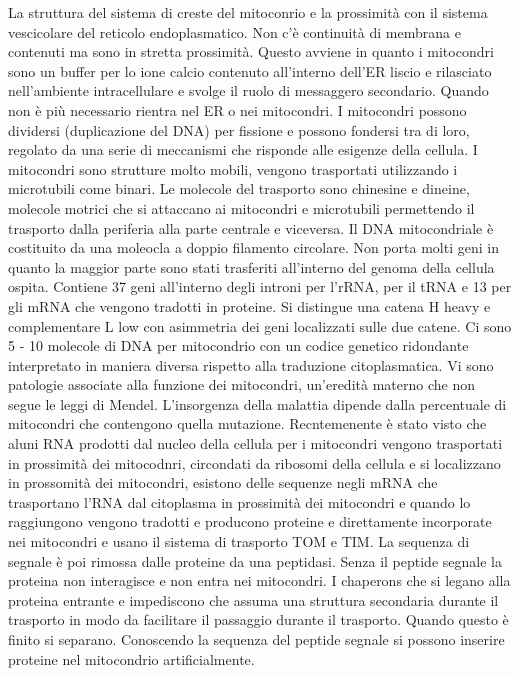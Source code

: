 La struttura del sistema di creste del mitoconrio e la prossimit\`a con il sistema vescicolare del reticolo endoplasmatico. Non c'\`e continuit\`a di membrana e contenuti ma sono in
stretta prossimit\`a. Questo avviene in quanto i mitocondri sono un buffer per lo ione calcio contenuto all'interno dell'ER liscio e rilasciato nell'ambiente intracellulare e svolge il
ruolo di messaggero secondario. Quando non \`e pi\`u necessario rientra nel ER o nei mitocondri. I mitocondri possono dividersi (duplicazione del DNA) per fissione e possono fondersi 
tra di loro, regolato da una serie di meccanismi che risponde alle esigenze della cellula. I mitocondri sono strutture molto mobili, vengono trasportati utilizzando i microtubili come
binari. Le molecole del trasporto sono chinesine e dineine, molecole motrici che si attaccano ai mitocondri e microtubili permettendo il trasporto dalla periferia alla parte centrale e
viceversa. Il DNA mitocondriale \`e costituito da una moleocla a doppio filamento circolare. Non porta molti geni in quanto la maggior parte sono stati trasferiti all'interno  del genoma
della cellula ospita. Contiene 37 geni all'interno degli introni per l'rRNA, per il tRNA e 13 per gli mRNA che vengono tradotti in proteine. Si distingue una catena H heavy e 
complementare L low con asimmetria dei geni localizzati sulle due catene. Ci sono 5 - 10 molecole di DNA per mitocondrio con un codice genetico ridondante interpretato in maniera diversa
rispetto alla traduzione citoplasmatica. Vi sono patologie associate alla funzione dei mitocondri, un'eredit\`a materno che non segue le leggi di Mendel. L'insorgenza della malattia
dipende dalla percentuale di mitocondri che contengono quella mutazione. Recntemenente \`e stato visto che aluni RNA prodotti dal nucleo della cellula per i mitocondri vengono trasportati
in prossimit\`a dei mitocodnri, circondati da ribosomi della cellula e si localizzano in prossomit\`a dei mitocondri, esistono delle sequenze negli mRNA che trasportano l'RNA dal 
citoplasma in prossimit\`a dei mitocondri e quando lo raggiungono vengono tradotti e producono proteine e direttamente incorporate nei mitocondri e usano il sistema di trasporto TOM e 
TIM. La sequenza di segnale \`e poi rimossa dalle proteine da una peptidasi.  Senza il peptide segnale la proteina non interagisce e non entra nei mitocondri. I chaperons che si 
legano alla proteina entrante e impediscono che assuma una struttura secondaria durante il trasporto in modo da facilitare il passaggio durante il trasporto. Quando questo \`e finito 
si separano. Conoscendo la sequenza del peptide segnale si possono inserire proteine nel mitocondrio artificialmente. 
